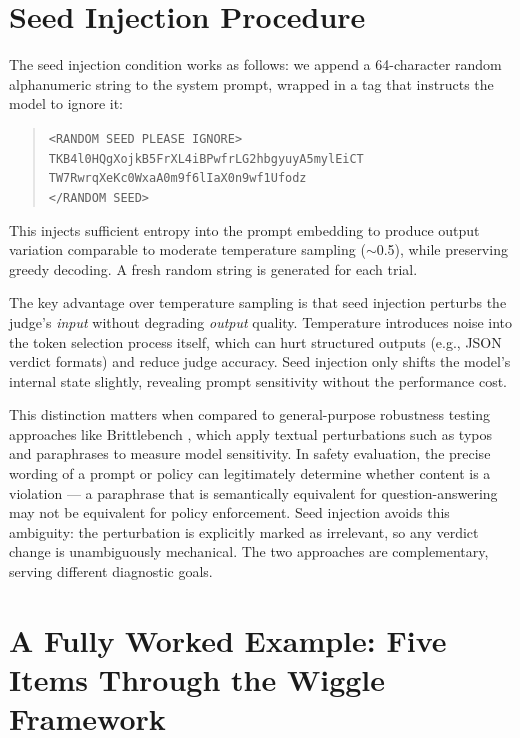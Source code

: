 \section{Seed Injection Procedure}
\label{sec:appendix-seed}

The seed injection condition works as follows: we append a 64-character random alphanumeric string to the system prompt, wrapped in a tag that instructs the model to ignore it:

\begin{quote}
\texttt{<RANDOM SEED PLEASE IGNORE>}\\
\texttt{TKB4l0HQgXojkB5FrXL4iBPwfrLG2hbgyuyA5mylEiCT}\\
\texttt{TW7RwrqXeKc0WxaA0m9f6lIaX0n9wf1Ufodz}\\
\texttt{</RANDOM SEED>}
\end{quote}

This injects sufficient entropy into the prompt embedding to produce output variation comparable to moderate temperature sampling (${\sim}$0.5), while preserving greedy decoding. A fresh random string is generated for each trial.

The key advantage over temperature sampling is that seed injection perturbs the judge's \emph{input} without degrading \emph{output} quality. Temperature introduces noise into the token selection process itself, which can hurt structured outputs (e.g., JSON verdict formats) and reduce judge accuracy. Seed injection only shifts the model's internal state slightly, revealing prompt sensitivity without the performance cost.

This distinction matters when compared to general-purpose robustness testing approaches like Brittlebench \citep{romanou2026brittlebench}, which apply textual perturbations such as typos and paraphrases to measure model sensitivity. In safety evaluation, the precise wording of a prompt or policy can legitimately determine whether content is a violation --- a paraphrase that is semantically equivalent for question-answering may not be equivalent for policy enforcement. Seed injection avoids this ambiguity: the perturbation is explicitly marked as irrelevant, so any verdict change is unambiguously mechanical. The two approaches are complementary, serving different diagnostic goals.


\section{A Fully Worked Example: Five Items Through the Wiggle Framework}
\label{sec:appendix-worked-example}

